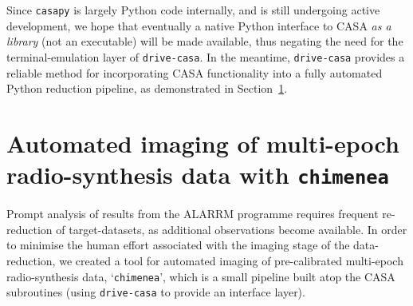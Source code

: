 \documentclass[5p,authoryear]{elsarticle}
\begin{document}
Since \texttt{casapy} is largely Python code internally, and is still undergoing active development, we hope that eventually a native Python interface to CASA \textit{as a library} (not an executable) will be made available, thus negating the need for the terminal-emulation layer of \texttt{drive-casa}. 
In the meantime, \texttt{drive-casa} provides a reliable method for incorporating CASA functionality into a fully automated Python reduction pipeline, as demonstrated in Section~\ref{sec:chimenea}.



\section{Automated imaging of multi-epoch radio-synthesis data with \texttt{chimenea}}
\label{sec:chimenea}
Prompt analysis of results from the ALARRM programme requires frequent re-reduction of target-datasets, as additional observations become available.
In order to minimise the human effort associated with the imaging stage of the data-reduction, we created a tool for automated imaging of pre-calibrated multi-epoch radio-synthesis data, `\texttt{chimenea}', which is a small pipeline built atop the CASA subroutines (using \texttt{drive-casa} to provide an interface layer). 
\end{document}
